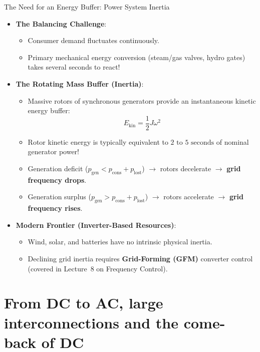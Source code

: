 \begin{frame}{The Need for an Energy Buffer: Power System Inertia}
\begin{itemize}
\item \textbf{The Balancing Challenge}:
  \begin{itemize}
    \item Consumer demand fluctuates continuously.
    \item Primary mechanical energy conversion (steam/gas valves, hydro gates) takes several seconds to react!
  \end{itemize}
\item \textbf{The Rotating Mass Buffer (Inertia)}:
  \begin{itemize}
    \item Massive rotors of synchronous generators provide an instantaneous kinetic energy buffer:
    $$E_{\text{kin}} = \frac{1}{2} J \omega^2$$
    \item Rotor kinetic energy is typically equivalent to $2\text{ to }5\text{ seconds}$ of nominal generator power!
    \item Generation deficit ($p_{\text{gen}} < p_{\text{cons}} + p_{\text{lost}}$) $\rightarrow$ rotors decelerate $\rightarrow$ \textbf{grid frequency drops}.
    \item Generation surplus ($p_{\text{gen}} > p_{\text{cons}} + p_{\text{lost}}$) $\rightarrow$ rotors accelerate $\rightarrow$ \textbf{grid frequency rises}.
  \end{itemize}
\item \textbf{Modern Frontier (Inverter-Based Resources)}:
  \begin{itemize}
    \item Wind, solar, and batteries have no intrinsic physical inertia.
    \item Declining grid inertia requires \textbf{Grid-Forming (GFM)} converter control (covered in Lecture~8 on Frequency Control).
  \end{itemize}
\end{itemize}
\end{frame}

\section{From DC to AC, large interconnections and the come-back of DC}


